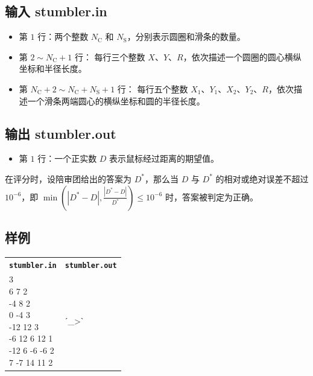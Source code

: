 \documentclass[UTF8, 11pt, a4paper]{article}
\begin{document}
\subsection*{输入 \makebox[0.5em]{} \small{stumbler.in}}
\begin{itemize}
    \item 第 $1$ 行：两个整数 $N_\mathrm{C}$ 和 $N_\mathrm{S}$，分别表示圆圈和滑条的数量。
    \item 第 $2 \sim N_\mathrm{C} + 1$ 行：%
        每行三个整数 $X$、$Y$、$R$，依次描述一个圆圈的圆心横纵坐标和半径长度。
    \item 第 $N_\mathrm{C} + 2 \sim N_\mathrm{C} + N_\mathrm{S} + 1$ 行：%
        每行五个整数 $X_1$、$Y_1$、$X_2$、$Y_2$、$R$，依次描述一个滑条两端圆心的横纵坐标和圆的半径长度。
\end{itemize}

\subsection*{输出 \makebox[0.5em]{} \small{stumbler.out}}
\begin{itemize}
    \item 第 $1$ 行：一个正实数 $D$ 表示鼠标经过距离的期望值。
\end{itemize}

在评分时，设陪审团给出的答案为 $D^*$，那么当 $D$ 与 $D^*$ 的相对或绝对误差不超过 %
$10^{-6}$，即 $\min\left(|D^* - D|, \frac{|D^* - D|}{D^*}\right) \leq 10^{-6}$ 时，答案被判定为正确。

\subsection*{样例}
\begin{table}[h]\centering
\begin{tabularx}{0.8 \textwidth}{|X|X|}
\hline
\texttt{\textbf{stumbler.in}} & \texttt{\textbf{stumbler.out}} \\ \hline
{\ttfamily
4 3\newline
6 7 2\newline
-4 8 2\newline
0 -4 3\newline
-12 12 3\newline
-6 12 6 12 1\newline
-12 6 -6 -6 2\newline
7 -7 14 11 2
} & {\ttfamily
ˊ\_>ˋ
}
\\ \hline
\end{tabularx}\end{table}
\end{document}
